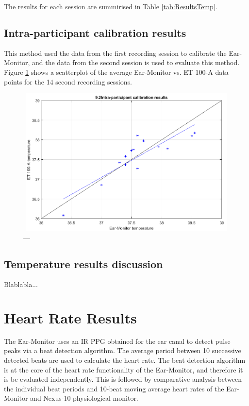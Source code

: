 The results for each session are summirised in Table \ref{tab:ResultsTemp}.

\subsection{Intra-participant calibration results}
This method used the data from the first recording session to calibrate the Ear-Monitor, and the data from the second session is used to evaluate this method. Figure \ref{fig:Temp2Scatter} shows a scatterplot of the average Ear-Monitor vs. ET 100-A data points for the 14 second recording sessions.

\begin{figure}[H]
   \centering
   \includegraphics[width=12cm,height=7.5cm]{figs/Temp2Scatter.png}
   \caption{---}
   \label{fig:Temp2Scatter}
\end{figure}

\subsection{Temperature results discussion}
Blablabla...


\section{Heart Rate Results}
The Ear-Monitor uses an IR PPG obtained for the ear canal to detect pulse peaks via a beat detection algorithm. The average period between 10 successive detected beats are used to calculate the heart rate. The beat detection algorithm is at the core of the heart rate functionality of the Ear-Monitor, and therefore it is be evaluated independently. This is followed by comparative analysis between the individual beat periods and 10-beat moving average heart rates of the Ear-Monitor and Nexus-10 physiological monitor.

